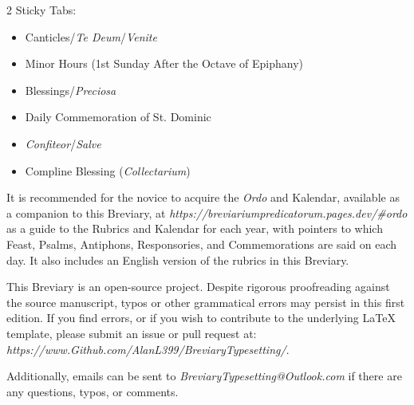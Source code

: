 \begin{multicols}{2}
\noindent Sticky Tabs:
\begin{itemize}[nosep,leftmargin=8pt]
	\item Canticles/\emph{Te Deum}/\emph{Venite}
	\item Minor Hours (1st Sunday After the Octave of Epiphany)
	\item Blessings/\emph{Preciosa}
	\item Daily Commemoration of St. Dominic
	\item \emph{Confiteor}/\emph{Salve}
	\item Compline Blessing (\emph{Collectarium})
\end{itemize}


{\color{Red} }

It is recommended for the novice to acquire the \emph{Ordo} and Kalendar, available as a companion to this Breviary, at \textit{https://breviariumpredicatorum.pages.dev/\#ordo} as a guide to the Rubrics and Kalendar for each year, with pointers to which Feast, Psalms, Antiphons, Responsories, and Commemorations are said on each day. It also includes an English version of the rubrics in this Breviary.

This Breviary is an open-source project. Despite rigorous proofreading against the source manuscript, typos or other grammatical errors may persist in this first edition. If you find errors, or if you wish to contribute to the underlying LaTeX template, please submit an issue or pull request at: \emph{https://www.Github.com/AlanL399/BreviaryTypesetting/}.

Additionally, emails can be sent to \emph{BreviaryTypesetting@Outlook.com} if there are any questions, typos, or comments.





\end{multicols}

